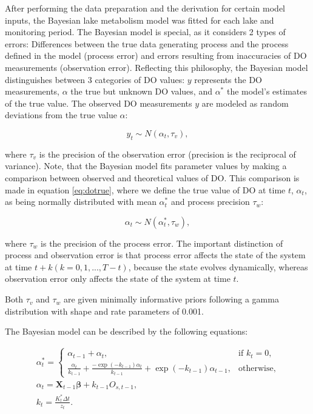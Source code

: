 \documentclass[11pt,lineno]{manuscript}\usepackage[]{graphicx}\usepackage[]{xcolor}
\begin{document}
After performing the data preparation and the derivation for certain model
inputs, the Bayesian lake metabolism model was fitted for each lake and
monitoring period. The Bayesian model is special, as it considers 2 types
of errors: Differences between the true data generating process and the process
defined in the model (process error) and errors resulting from inaccuracies
of DO measurements (observation error). Reflecting this philosophy, the
Bayesian model distinguishes between 3 categories of DO values: $y$ represents
the DO measurements, $\alpha$ the true but unknown DO values, and
$\alpha^{\ast}$ the model's estimates of the true value.
The observed DO measurements $y$ are modeled as random deviations from the true
value $\alpha$:

\begin{equation}
y_{t} \sim N(\alpha_{t}, \tau_{v}),
\label{eq:doobs}
\end{equation}

where $\tau_{v}$ is the precision of the observation error (precision is
the reciprocal of variance).
Note, that the Bayesian model fits parameter values by making a comparison
between observed and theoretical values of DO.
This comparison is made in equation \ref{eq:dotrue}, where we define the true value of 
DO at time $t$, $\alpha_{t}$, as being normally distributed with mean 
$\alpha^{\ast}_{t}$ and process precision $\tau_{w}$:

\begin{equation}
\alpha_{t} \sim N(\alpha^{\ast}_{t}, \tau_{w}),
\label{eq:dotrue}
\end{equation}

where $\tau_{w}$ is the precision of the process error.
The important distinction of process and observation error is that
process error affects the state of the system at time
$t + k (k=0, 1, ..., T-t)$, because the state evolves dynamically, whereas
observation error only affects the state of the system at time $t$.

Both $\tau_{v}$ and $\tau_{w}$ are given minimally informative priors
following a gamma distribution with shape and rate parameters of 0.001.

The Bayesian model can be described by the following equations:

\begin{gather}
\alpha^{\ast}_{t} =
\begin{cases}
\alpha_{t-1} + \alpha_{t}, & \text{if } k_{t} = 0, \\
\frac{\alpha_{t}}{k_{t-1}} + \frac{-\exp{(-k_{t-1})}\alpha_{t}}{k_{t-1}} +
\exp{(-k_{t-1})}\alpha_{t-1}, & \text{otherwise},
\end{cases} \label{eq:sys1} \\
\alpha_{t} = \mathbf{X}_{t-1}\bm{\beta} + k_{t-1}O_{s,t-1}, \label{eq:sys2} \\
k_{t} = \frac{K^{\ast}_{t}\Delta t}{z_{t}}. \label{eq:sys3}
\end{gather}
\end{document}
